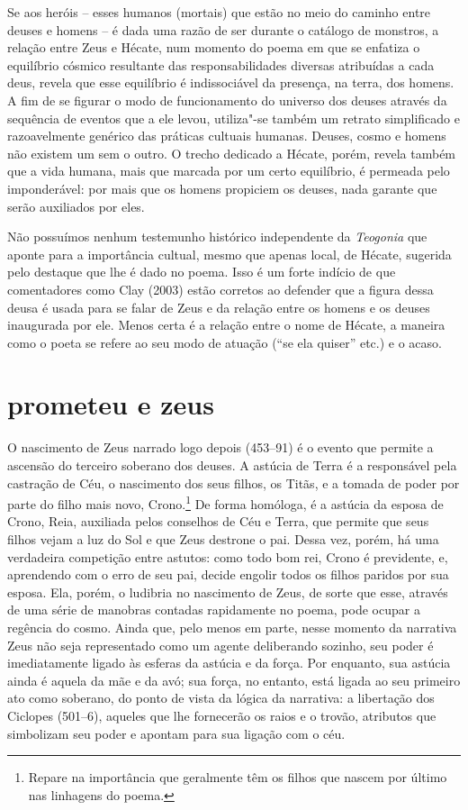Se aos heróis – esses humanos (mortais) que estão no meio do caminho entre
deuses e homens – é dada uma razão de ser durante o catálogo de monstros, a
relação entre Zeus e Hécate, num momento do poema em que se enfatiza o
equilíbrio cósmico resultante das responsabilidades diversas atribuídas a cada
deus, revela que esse equilíbrio é indissociável da presença, na terra, dos
homens. A fim de se figurar o modo de
funcionamento do universo dos deuses através da sequência de eventos que a ele
levou, utiliza"-se também um retrato simplificado e razoavelmente genérico das
práticas cultuais humanas. Deuses, cosmo e homens não existem um sem o outro. O
trecho dedicado a Hécate, porém, revela também que a vida humana, mais que
marcada por um certo equilíbrio, é permeada pelo imponderável: por mais que os
homens propiciem os deuses, nada garante que serão auxiliados por eles. 

Não possuímos nenhum testemunho histórico independente da \textit{Teogonia} que
aponte para a importância cultual, mesmo que apenas local, de Hécate, sugerida
pelo destaque que lhe é dado no poema. Isso é um forte indício de que
comentadores como Clay (2003) estão corretos ao defender que a figura dessa
deusa é usada para se falar de Zeus e da relação entre os homens e os deuses
inaugurada por ele. Menos certa é a relação entre o nome de Hécate, a maneira
como o poeta se refere ao seu modo de atuação (“se ela quiser” etc.) e o acaso.

\section{prometeu e zeus}

O nascimento de Zeus narrado logo depois (453--91) é o evento que permite a
ascensão do terceiro soberano dos deuses. A astúcia de Terra é a responsável
pela castração de Céu, o nascimento dos seus filhos, os Titãs, e a tomada de
poder por parte do filho mais novo, Crono.\footnote{ Repare na importância que geralmente
têm os filhos que nascem por último nas linhagens do poema.} De forma homóloga,
é a astúcia da esposa de Crono, Reia, auxiliada pelos conselhos de Céu e Terra,
que permite que seus filhos vejam a luz do Sol e que Zeus destrone o pai. Dessa
vez, porém, há uma verdadeira competição entre astutos: como todo bom rei,
Crono é previdente, e, aprendendo com o erro de seu pai, decide engolir todos
os filhos paridos por sua esposa. Ela, porém, o ludibria no nascimento de Zeus,
de sorte que esse, através de uma série de manobras contadas rapidamente no
poema, pode ocupar a regência do cosmo. Ainda que, pelo menos em parte, nesse
momento da narrativa Zeus não seja representado como um agente deliberando
sozinho, seu poder é imediatamente ligado às esferas da
astúcia e da força. Por enquanto, sua astúcia ainda é aquela da mãe e da avó; sua
força, no entanto, está ligada ao seu primeiro ato como soberano, do ponto de
vista da lógica da narrativa: a libertação dos Ciclopes (501--6), aqueles que
lhe fornecerão os raios e o trovão, atributos que simbolizam seu poder e
apontam para sua ligação com o céu.

